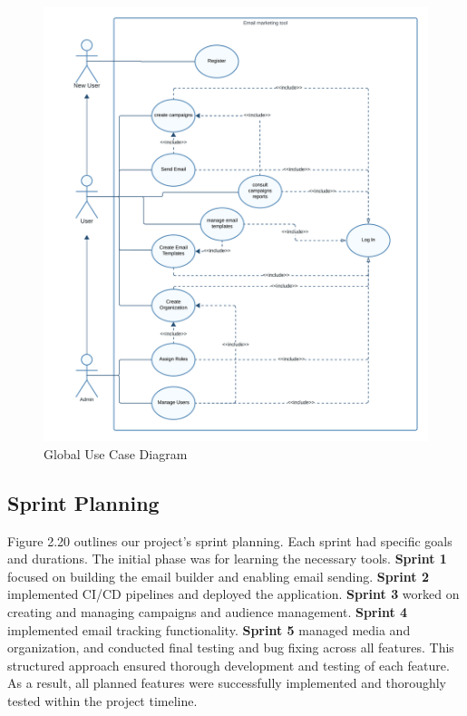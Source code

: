 \begin{figure}[ht]
	\centering
	\includegraphics[width=\linewidth]{Images//images/global use case diag.png}
	\caption{Global Use Case Diagram}
	\label{fig:Global Use Case Diagram}
\end{figure}

\newpage

\subsection{Sprint Planning}

Figure 2.20 outlines our project's sprint planning. Each sprint had specific goals and durations. The initial phase was for learning the necessary tools. \textbf{Sprint 1} focused on building the email builder and enabling email sending. \textbf{Sprint 2} implemented CI/CD pipelines and deployed the application. \textbf{Sprint 3} worked on creating and managing campaigns and audience management. \textbf{Sprint 4} implemented email tracking functionality. \textbf{Sprint 5} managed media and organization, and conducted final testing and bug fixing across all features. This structured approach ensured thorough development and testing of each feature. As a result, all planned features were successfully implemented and thoroughly tested within the project timeline.

